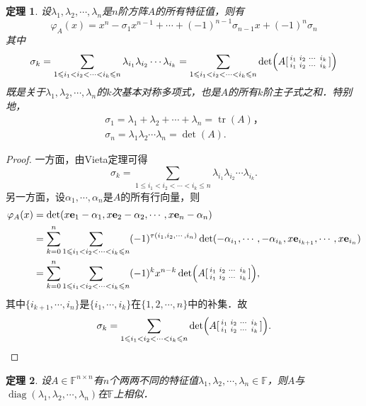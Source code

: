 \documentclass[a4paper,fontset=windows]{ctexbook}
\newtheorem{theorem}{定理}[chapter]
\theoremstyle{definition}
\DeclareMathOperator{\diag}{diag}
\DeclareMathOperator{\tr}{tr}
\renewcommand{\le}{\leqslant}
\begin{document}
\begin{theorem}\label{thm5.2}
设$\lambda_1,\lambda_2,\cdots,\lambda_n$是$n$阶方阵$A$的所有特征值，则有
$$\varphi_A(x)=x^n-\sigma_1x^{n-1}+\cdots+(-1)^{n-1}\sigma_{n-1}x+(-1)^n\sigma_n$$
其中
$$\sigma_k=\sum\limits_{1\le i_1<i_2<\cdots<i_k\le n}\lambda_{i_1}\lambda_{i_2}\cdots\lambda_{i_k}=\sum\limits_{1\le i_1<i_2<\cdots<i_k\le n}\det\Bigl(A[\begin{smallmatrix}i_1&i_2&\cdots&i_k \\ i_1&i_2&\cdots&i_k\end{smallmatrix}]\Bigr)$$
既是关于$\lambda_1,\lambda_2,\cdots,\lambda_n$的$k$次基本对称多项式，也是$A$的所有$k$阶主子式之和．特别地，
\begin{gather*}
\sigma_1=\lambda_1+\lambda_2+\cdots+\lambda_n=\tr(A)， \\\sigma_n=\lambda_1\lambda_2\cdots\lambda_n=\det(A).
\end{gather*}
\end{theorem}

\begin{proof}
一方面，由Vieta定理可得
$$\sigma_k=\sum\limits_{1\le i_1<i_2<\cdots<i_k\le n}\lambda_{i_1}\lambda_{i_2}\cdots\lambda_{i_k}.$$
另一方面，设$\alpha_1,\cdots,\alpha_n$是$A$的所有行向量，则
\begin{align*}
\varphi_A(x)&=\det(x{\bf e}_1-\alpha_1,x{\bf e}_2-\alpha_2,\cdots,x{\bf e}_n-\alpha_n) \\
&=\sum_{k=0}^n\sum_{1\le i_1<i_2<\cdots<i_k\le n}(-1)^{\tau(i_1,i_2,\cdots,i_n)}\det(-\alpha_{i_1},\cdots,-\alpha_{i_k},x{\bf e}_{i_{k+1}},\cdots,x{\bf e}_{i_n}) \\
&=\sum_{k=0}^n\sum_{1\le i_1<i_2<\cdots<i_k\le n}(-1)^kx^{n-k}\det\Bigl(A[\begin{smallmatrix}i_1&i_2&\cdots&i_k \\ i_1&i_2&\cdots&i_k\end{smallmatrix}]\Bigr),
\end{align*}
其中$\{i_{k+1},\cdots,i_n\}$是$\{i_1,\cdots,i_k\}$在$\{1,2,\cdots,n\}$中的补集．故
\begin{equation*}
\sigma_k=\sum_{1\le i_1<i_2<\cdots<i_k\le n}\det\Bigl(A[\begin{smallmatrix}i_1&i_2&\cdots&i_k \\ i_1&i_2&\cdots&i_k\end{smallmatrix}]\Bigr).\qedhere
\end{equation*}
\end{proof}

\begin{theorem}\label{thm5.3}
设$A\in\mathbb{F}^{n\times n}$有$n$个两两不同的特征值$\lambda_1,\lambda_2,\cdots,\lambda_n\in\mathbb{F}$，则$A$与$\diag(\lambda_1,\lambda_2,\cdots,\lambda_n)$在$\mathbb{F}$上相似．
\end{theorem}
\end{document}
